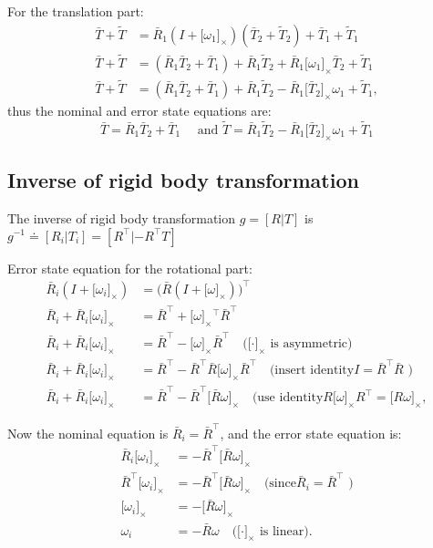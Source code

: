 \documentclass[letter,10pt]{article}
\newcommand{\asym}[1]{{\lbrack #1\rbrack}_\times{}}
\begin{document}
For the translation part:
\begin{align}
\bar T + \tilde T &= \bar R_1(I + \asym{\omega_1})(\bar T_2 + \tilde T_2) + \bar T_1 + \tilde T_1 \\
\bar T + \tilde T &= (\bar R_1 \bar T_2 + \bar T_1) + \bar R_1 \tilde T_2 + \bar R_1 \asym{\omega_1} \bar T_2 + \tilde T_1 \\
\bar T + \tilde T &= (\bar R_1 \bar T_2 + \bar T_1) + \bar R_1 \tilde T_2 - \bar R_1 \asym{\bar T_2} \omega_1 + \tilde T_1,
\end{align}
thus the nominal and error state equations are:
$$
\bar T = \bar R_1 \bar T_2 + \bar T_1 \quad\text{ and } \tilde T = \bar R_1 \tilde T_2 -\bar R_1 \asym{\bar T_2} \omega_1 + \tilde T_1
$$

\subsection{Inverse of rigid body transformation}
The inverse of rigid body transformation $g=[R | T]$ is $g^{-1}\doteq [R_i | T_i]=[R^\top|-R^\top T]$

Error state equation for the rotational part:
\begin{align}
    \bar R_i (I + \asym{\omega_i}) &= \big(\bar R(I + \asym{\omega})\big)^\top \\
    \bar R_i + \bar R_i \asym{\omega_i} &= \bar R^\top + \asym{\omega}^\top \bar R^\top \\
    \bar R_i + \bar R_i \asym{\omega_i} &= \bar R^\top - \asym{\omega} \bar R^\top\quad\text{(}\asym{\cdot}\text{ is asymmetric)}\\
    \bar R_i + \bar R_i \asym{\omega_i} &= \bar R^\top - \bar R^\top \bar R \asym{\omega} \bar R^\top\quad\text{(insert identity} I=\bar R^\top\bar R\text{ )} \\
    \bar R_i + \bar R_i \asym{\omega_i} &= \bar R^\top - \bar R^\top \asym{\bar R\omega}\quad\text{(use identity} R\asym{\omega}R^\top=\asym{R\omega},
\end{align}

Now the nominal equation is $\bar R_i = \bar R^\top$, and the error state equation is:
\begin{align}
    \bar R_i\asym{\omega_i} &= -\bar R^\top\asym{\bar R\omega} \\
    \bar R^\top \asym{\omega_i} &= -\bar R^\top\asym{\bar R\omega}\quad\text{(since} \bar R_i=\bar R^\top\text{ )} \\
    \asym{\omega_i} &= -\asym{\bar R\omega} \\
    \omega_i &= -\bar R\omega\quad\text{(} \asym{\cdot}\text{ is linear)}.
\end{align}
\end{document}
